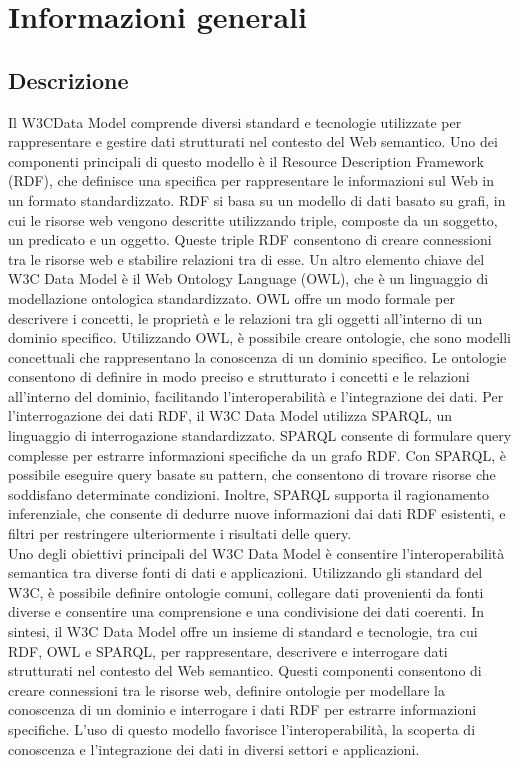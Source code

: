 \section{Informazioni generali}
\subsection{Descrizione}
Il W3C\glo Data Model comprende diversi standard e tecnologie utilizzate per rappresentare e gestire dati strutturati nel contesto del Web semantico. Uno dei componenti principali di questo modello è il Resource Description Framework (RDF), che definisce una specifica per rappresentare le informazioni sul Web in un formato standardizzato. RDF si basa su un modello di dati basato su grafi, in cui le risorse web vengono descritte utilizzando triple, composte da un soggetto, un predicato e un oggetto. Queste triple RDF consentono di creare connessioni tra le risorse web e stabilire relazioni tra di esse. 
Un altro elemento chiave del W3C Data Model è il Web Ontology Language (OWL), che è un linguaggio di modellazione ontologica standardizzato. OWL offre un modo formale per descrivere i concetti, le proprietà e le relazioni tra gli oggetti all'interno di un dominio specifico. Utilizzando OWL, è possibile creare ontologie, che sono modelli concettuali che rappresentano la conoscenza di un dominio specifico. Le ontologie consentono di definire in modo preciso e strutturato i concetti e le relazioni all'interno del dominio, facilitando l'interoperabilità e l'integrazione dei dati.
Per l'interrogazione dei dati RDF, il W3C Data Model utilizza SPARQL, un linguaggio di interrogazione standardizzato. SPARQL consente di formulare query complesse per estrarre informazioni specifiche da un grafo RDF. Con SPARQL, è possibile eseguire query basate su pattern, che consentono di trovare risorse che soddisfano determinate condizioni. Inoltre, SPARQL supporta il ragionamento inferenziale, che consente di dedurre nuove informazioni dai dati RDF esistenti, e filtri per restringere ulteriormente i risultati delle query.\\
Uno degli obiettivi principali del W3C Data Model è consentire l'interoperabilità semantica tra diverse fonti di dati e applicazioni. Utilizzando gli standard del W3C, è possibile definire ontologie comuni, collegare dati provenienti da fonti diverse e consentire una comprensione e una condivisione dei dati coerenti.
In sintesi, il W3C Data Model offre un insieme di standard e tecnologie, tra cui RDF, OWL e SPARQL, per rappresentare, descrivere e interrogare dati strutturati nel contesto del Web semantico. Questi componenti consentono di creare connessioni tra le risorse web, definire ontologie per modellare la conoscenza di un dominio e interrogare i dati RDF per estrarre informazioni specifiche. L'uso di questo modello favorisce l'interoperabilità, la scoperta di conoscenza e l'integrazione dei dati in diversi settori e applicazioni.\\

